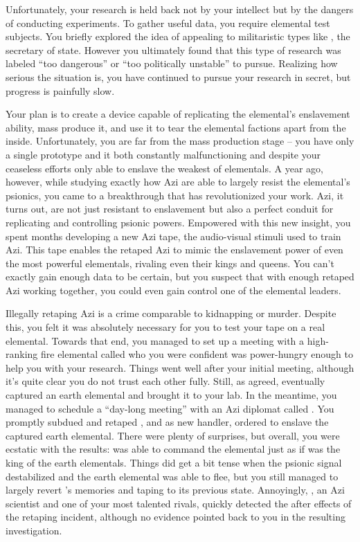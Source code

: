 \documentclass[char]{elementals}
\begin{document}
Unfortunately, your research is held back not by your intellect but by the dangers of conducting experiments. To gather useful data, you require elemental test subjects. You briefly explored the idea of appealing to militaristic types like \cDema{\intro}, the secretary of state. However you ultimately found that this type of research was labeled ``too dangerous'' or ``too politically unstable'' to pursue. Realizing how serious the situation is, you have continued to pursue your research in secret, but progress is painfully slow.

Your plan is to create a device capable of replicating the elemental's enslavement ability, mass produce it, and use it to tear the elemental factions apart from the inside. Unfortunately, you are far from the mass production stage -- you have only a single prototype and it both constantly malfunctioning and despite your ceaseless efforts only able to enslave the weakest of elementals. A year ago, however, while studying exactly how Azi are able to largely resist the elemental's psionics, you came to a breakthrough that has revolutionized your work. Azi, it turns out, are not just resistant to enslavement but also a perfect conduit for replicating and controlling psionic powers. Empowered with this new insight, you spent months developing a new Azi tape, the audio-visual stimuli used to train Azi. This tape enables the retaped Azi to mimic the enslavement power of even the most powerful elementals, rivaling even their kings and queens. You can't exactly gain enough data to be certain, but you suspect that with enough retaped Azi working together, you could even gain control one of the elemental leaders.

Illegally retaping Azi is a crime comparable to kidnapping or murder. Despite this, you felt it was absolutely necessary for you to test your tape on a real elemental. Towards that end, you managed to set up a meeting with a high-ranking fire elemental called \cPyro{\intro} who you were confident was power-hungry enough to help you with your research. Things went well after your initial meeting, although it's quite clear you do not trust each other fully. Still, as agreed, \cPyro{} eventually captured an earth elemental and brought it to your lab. In the meantime, you managed to schedule a ``day-long meeting'' with an Azi diplomat called \cDiplomat{\intro}. You promptly subdued and retaped \cDiplomat{}, and as \cDiplomat{\their} new handler, ordered \cDiplomat{\them} to enslave the captured earth elemental. There were plenty of surprises, but overall, you were ecstatic with the results: \cDiplomat{} was able to command the elemental just as if \cDiplomat{\they} was the king of the earth elementals. Things did get a bit tense when the psionic signal destabilized and the earth elemental was able to flee, but you still managed to largely revert \cDiplomat{}'s memories and taping to its previous state. Annoyingly, \cScientist{\intro}, an Azi scientist and one of your most talented rivals, quickly detected the after effects of the retaping incident, although no evidence pointed back to you in the resulting investigation.
\end{document}
